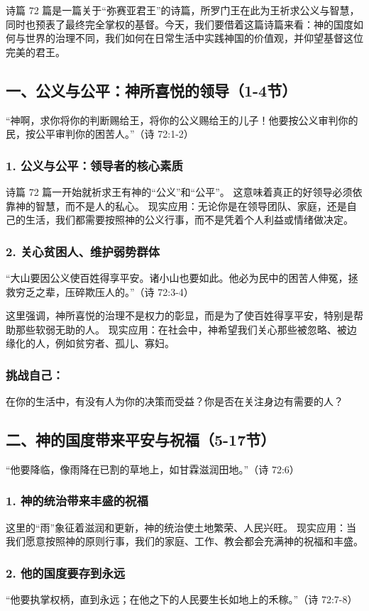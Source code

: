 \documentclass[a4paper, 12pt]{article}
\begin{document}
诗篇 72 篇是一篇关于“弥赛亚君王”的诗篇，所罗门王在此为王祈求公义与智慧，同时也预表了最终完全掌权的基督。今天，我们要借着这篇诗篇来看：神的国度如何与世界的治理不同，我们如何在日常生活中实践神国的价值观，并仰望基督这位完美的君王。

\subsection*{一、公义与公平：神所喜悦的领导（1-4节）}
“神啊，求你将你的判断赐给王，将你的公义赐给王的儿子！他要按公义审判你的民，按公平审判你的困苦人。”（诗 72:1-2）

\subsubsection*{1. 公义与公平：领导者的核心素质}
诗篇 72 篇一开始就祈求王有神的“公义”和“公平”。
这意味着真正的好领导必须依靠神的智慧，而不是人的私心。
现实应用：无论你是在领导团队、家庭，还是自己的生活，我们都需要按照神的公义行事，而不是凭着个人利益或情绪做决定。
\subsubsection*{2. 关心贫困人、维护弱势群体}
“大山要因公义使百姓得享平安。诸小山也要如此。他必为民中的困苦人伸冤，拯救穷乏之辈，压碎欺压人的。”（诗 72:3-4）

这里强调，神所喜悦的治理不是权力的彰显，而是为了使百姓得享平安，特别是帮助那些软弱无助的人。
现实应用：在社会中，神希望我们关心那些被忽略、被边缘化的人，例如贫穷者、孤儿、寡妇。
\subsubsection*{挑战自己：}

在你的生活中，有没有人为你的决策而受益？你是否在关注身边有需要的人？
\subsection*{二、神的国度带来平安与祝福（5-17节）}
“他要降临，像雨降在已割的草地上，如甘霖滋润田地。”（诗 72:6）

\subsubsection*{1. 神的统治带来丰盛的祝福}
这里的“雨”象征着滋润和更新，神的统治使土地繁荣、人民兴旺。
现实应用：当我们愿意按照神的原则行事，我们的家庭、工作、教会都会充满神的祝福和丰盛。
\subsubsection*{2. 他的国度要存到永远}
“他要执掌权柄，直到永远；在他之下的人民要生长如地上的禾稼。”（诗 72:7-8）
\end{document}
